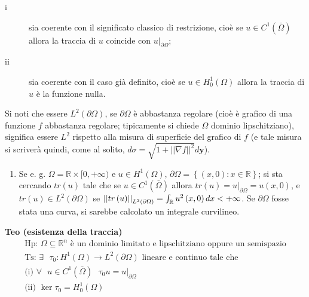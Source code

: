 \documentclass{article}
\begin{document}
\begin{description}
\item[i] sia coerente con il significato classico di restrizione, cio\`{e}
se $u\in C^{1}\left( \bar{\Omega}\right) $ allora la
traccia di $u$ coincide con $u|_{\partial \Omega }$;

\item[ii] sia coerente con il caso gi\`{a} definito, cio\`{e} se $u\in
H_{0}^{1}\left( \Omega \right) $ allora la traccia di $u$ \`{e} la funzione
nulla.
\end{description}

Si noti che essere $L^{2}\left( \partial \Omega \right) $, se $\partial
\Omega $ \`{e} abbastanza regolare (cio\`{e} \`{e} grafico di una funzione $%
f $ abbastanza regolare; tipicamente si chiede $\Omega $ dominio
lipschitziano), significa essere $L^{2}$ rispetto alla misura di superficie
del grafico di $f$ (e tale misura si scriver\`{a} quindi, come al solito, $%
d\sigma =\sqrt{1+\left\vert \left\vert \nabla f\right\vert \right\vert ^{2}}d%
\mathbf{y}$).

\begin{enumerate}
\item Se e. g. $\Omega =%
\mathbb{R}
\times \lbrack 0,+\infty )$ e $u\in H^{1}\left( \Omega \right) $, $\partial
\Omega =\left\{ \left( x,0\right) :x\in 
\mathbb{R}
\right\} $; si sta cercando $tr\left( u\right) $ tale che se $u\in
C^{1}\left( \bar{\Omega}\right) $ allora $tr\left( u\right) =u|_{\partial
\Omega }=u\left( x,0\right) $, e $tr\left( u\right) \in L^{2}\left( \partial
\Omega \right) $ se $\left\vert \left\vert tr\left( u\right) \right\vert
\right\vert _{L^{2}\left( \partial \Omega \right) }=\int_{%
\mathbb{R}
}u^{2}\left( x,0\right) dx<+\infty $. Se $\partial \Omega $ fosse stata una
curva, si sarebbe calcolato un integrale curvilineo.
\end{enumerate}

\textbf{Teo (esistenza della traccia)}%
\begin{gather*}
\text{Hp: }\Omega \subseteq 
\mathbb{R}
^{n}\text{ \`{e} un dominio limitato e lipschitziano oppure un semispazio} \\
\text{Ts: }\exists \text{ }\tau _{0}:H^{1}\left( \Omega \right) \rightarrow
L^{2}\left( \partial \Omega \right) \text{ lineare e continuo tale che} \\
\text{(i) }\forall \text{ }u\in C^{1}\left( \bar{\Omega}\right) \text{ }\tau
_{0}u=u|_{\partial \Omega } \\
\text{(ii) }\ker \tau _{0}=H_{0}^{1}\left( \Omega \right)
\end{gather*}
\end{document}
